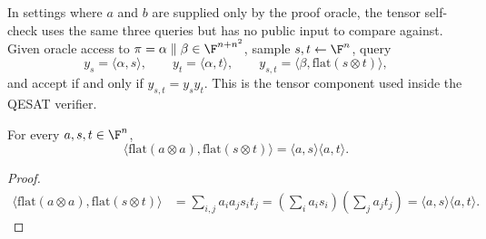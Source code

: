 \begin{definition}\label{TENSORQ.selfVerifier}\leanok
In settings where \(a\) and \(b\) are supplied only by the proof oracle, the tensor self-check uses the same three
queries but has no public input to compare against. Given oracle access to
\(\pi=\alpha\parallel\beta\in\F^{n+n^2}\), sample \(s,t\leftarrow\F^n\), query
\[
  y_s=\langle\alpha,s\rangle,\qquad
  y_t=\langle\alpha,t\rangle,\qquad
  y_{s,t}=\langle\beta,\mathrm{flat}(s\otimes t)\rangle,
\]
and accept if and only if \(y_{s,t}=y_s y_t\). This is the tensor component used inside the QESAT verifier.
\end{definition}

\begin{lemma}\label{TENSORQ.tensor_check_complete}\leanok
For every \(a,s,t\in\F^n\),
\[
  \langle \mathrm{flat}(a\otimes a),\mathrm{flat}(s\otimes t)\rangle
  = \langle a,s\rangle \langle a,t\rangle.
\]
\end{lemma}
\begin{proof}\leanok
\begin{align*}
  \langle \mathrm{flat}(a\otimes a),\mathrm{flat}(s\otimes t)\rangle
    &= \sum_{i,j} a_i a_j s_i t_j
     = \left(\sum_i a_i s_i\right)\left(\sum_j a_j t_j\right)
     = \langle a,s\rangle \langle a,t\rangle.
\end{align*}
\end{proof}

